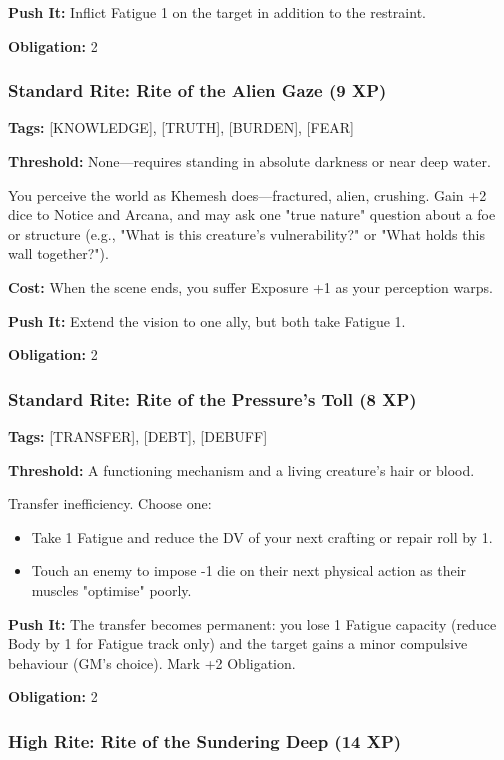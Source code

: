 \textbf{Push It:} Inflict Fatigue 1 on the target in addition to the restraint.

\textbf{Obligation:} 2

\subsubsection{Standard Rite: Rite of the Alien Gaze (9 XP)}

\textbf{Tags:} [KNOWLEDGE], [TRUTH], [BURDEN], [FEAR]

\textbf{Threshold:} None—requires standing in absolute darkness or near deep water.

You perceive the world as Khemesh does—fractured, alien, crushing. Gain +2 dice to Notice and Arcana, and may ask one "true nature" question about a foe or structure (e.g., "What is this creature's vulnerability?" or "What holds this wall together?").

\textbf{Cost:} When the scene ends, you suffer Exposure +1 as your perception warps.

\textbf{Push It:} Extend the vision to one ally, but both take Fatigue 1.

\textbf{Obligation:} 2

\subsubsection{Standard Rite: Rite of the Pressure's Toll (8 XP)}

\textbf{Tags:} [TRANSFER], [DEBT], [DEBUFF]

\textbf{Threshold:} A functioning mechanism and a living creature's hair or blood.

Transfer inefficiency. Choose one:
\begin{itemize}
\item Take 1 Fatigue and reduce the DV of your next crafting or repair roll by 1.
\item Touch an enemy to impose -1 die on their next physical action as their muscles "optimise" poorly.
\end{itemize}

\textbf{Push It:} The transfer becomes permanent: you lose 1 Fatigue capacity (reduce Body by 1 for Fatigue track only) and the target gains a minor compulsive behaviour (GM's choice). Mark +2 Obligation.

\textbf{Obligation:} 2

\subsubsection{High Rite: Rite of the Sundering Deep (14 XP)}

